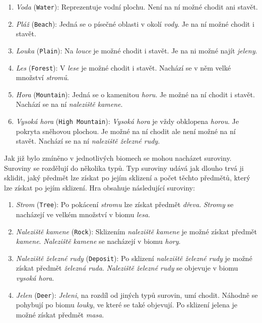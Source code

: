 \begin{enumerate}
    \item \textit{Voda} (\verb|Water|): Reprezentuje vodní plochu. Není na ní možné chodit ani stavět.
    \item \textit{Pláž} (\verb|Beach|): Jedná se o písečné oblasti v okolí \textit{vody}. Je na ní možné chodit i stavět.
    \item \textit{Louka} (\verb|Plain|): Na \textit{louce} je možné chodit i stavět. Je na ni možné najít \textit{jeleny}.
    \item \textit{Les} (\verb|Forest|): V \textit{lese} je možné chodit i stavět. Nachází se v něm velké množství \textit{stromů}.
    \item \textit{Hora} (\verb|Mountain|): Jedná se o kamenitou \textit{horu}. Je možné na ní chodit i stavět. Nachází se na ní \textit{naleziště kamene}.
    \item \textit{Vysoká hora} (\verb|High Mountain|): \textit{Vysoká hora} je vždy obklopena \textit{horou}. Je pokryta sněhovou plochou. Je možné na ní chodit ale není možné na ní stavět. Nachází se na ní \textit{naleziště železné rudy}.
\end{enumerate}

Jak již bylo zmíněno v jednotlivých biomech se mohou nacházet suroviny. Suroviny se rozdělují do několika typů. Typ suroviny udává jak dlouho trvá ji sklidit, jaký předmět lze získat po jejím sklizení a počet těchto předmětů, který lze získat po jejím sklizení. Hra obsahuje následující suroviny:

\begin{enumerate}
    \item \textit{Strom} (\verb|Tree|): Po pokácení \textit{stromu} lze získat předmět \textit{dřeva}. \textit{Stromy} se nacházejí ve velkém množství v biomu \textit{lesa}.
    \item \textit{Naleziště kamene} (\verb|Rock|): Sklizením \textit{naleziště kamene} je možné získat předmět \textit{kamene}. \textit{Naleziště kamene} se nacházejí v biomu \textit{hory}.
    \item \textit{Naleziště železné rudy} (\verb|Deposit|): Po sklizení \textit{naleziště železné rudy} je možné získat předmět \textit{železná ruda}. \textit{Naleziště železné rudy} se objevuje v biomu \textit{vysoká hora}.
    \item \textit{Jelen} (\verb|Deer|): \textit{Jeleni}, na rozdíl od jiných typů surovin, umí chodit. Náhodně se pohybují po biomu \textit{louky}, ve které se také objevují. Po sklizení jelena je možné získat předmět \textit{masa}.
\end{enumerate}

